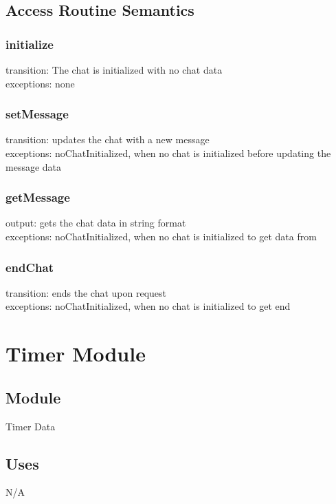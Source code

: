 \documentclass[12pt, titlepage]{article}
\begin{document}
    \subsection*{Access Routine Semantics}
    \subsubsection*{initialize} 
            transition: The chat is initialized with no chat data\\
            exceptions: none
            
        \subsubsection*{setMessage} 
            transition: updates the chat with a new message\\
            exceptions: noChatInitialized, when no chat is initialized before updating the message data\\
        
        \subsubsection*{getMessage} 
            output: gets the chat data in string format\\
            exceptions: noChatInitialized, when no chat is initialized to get data from\\
        
        \subsubsection*{endChat} 
            transition: ends the chat upon request\\
            exceptions: noChatInitialized, when no chat is initialized to get end\\

\newpage
\section*{Timer Module}
    \subsection*{Module}
        Timer Data
    
    \subsection*{Uses}
        N/A
        
\end{document}
